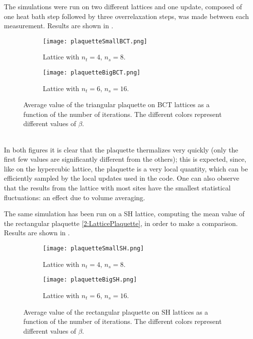 The simulations were run on two different lattices and one update, composed of one heat bath step followed by three overrelaxation steps, was made between each measurement.
Results are shown in .
\begin{figure}[!htbp]
    \centering
    \begin{subfigure}[b]{0.49\textwidth}
        \texttt{[image: plaquetteSmallBCT.png]}
        \caption{Lattice with $n_t=4$, $n_s=8$.}
        \label{4F:PlaqIterSmallBCT}
    \end{subfigure}
    \begin{subfigure}[b]{0.49\textwidth}
        \texttt{[image: plaquetteBigBCT.png]}
        \caption{Lattice with $n_t=6$, $n_s=16$.}
        \label{4F:PlaqIterBigBCT}
    \end{subfigure}
    \caption{Average value of the triangular plaquette on BCT lattices as a function of the number of iterations. The different colors represent different values of $\beta$.}
    \label{4F:PlaqIterBCT}
\end{figure}\\
In both figures it is clear that the plaquette thermalizes very quickly (only the first few values are significantly different from the others); this is expected, since, like on the hypercubic lattice, the plaquette is a very local quantity, which can be efficiently sampled by the local updates used in the code.
One can also observe that the results from the lattice with most sites have the smallest statistical fluctuations: an effect due to volume averaging.

The same simulation has been run on a SH lattice, computing the mean value of the rectangular plaquette \eqref{2:LatticePlaquette}, in order to make a comparison.\\
Results are shown in .
\begin{figure}[!htbp]
    \centering
    \begin{subfigure}[b]{0.49\textwidth}
        \texttt{[image: plaquetteSmallSH.png]}
        \caption{Lattice with $n_t=4$, $n_s=8$.}
        \label{4F:PlaqIterSmallSH}
    \end{subfigure}
    \begin{subfigure}[b]{0.49\textwidth}
        \texttt{[image: plaquetteBigSH.png]}
        \caption{Lattice with $n_t=6$, $n_s=16$.}
        \label{4F:PlaqIterBigSH}
    \end{subfigure}
    \caption{Average value of the rectangular plaquette on SH lattices as a function of the number of iterations. The different colors represent different values of $\beta$.}
    \label{4F:PlaqIterSH}
\end{figure}

